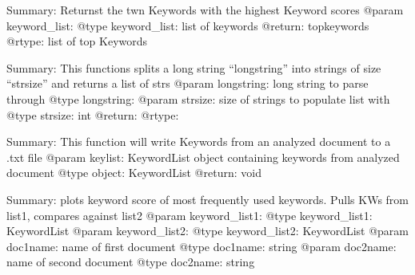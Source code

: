\documentclass[letterpaper,10pt,english]{sphinxmanual}
\begin{document}

\begin{fulllineitems}
\label{\detokenize{functionsv1:common_functions.kwhighestkeyscores}}
Summary: Returnst the twn Keywords with the highest Keyword scores
@param keyword\_list:
@type keyword\_list: list of keywords
@return: topkeywords
@rtype: list of top Keywords

\end{fulllineitems}


\begin{fulllineitems}
\label{\detokenize{functionsv1:common_functions.longstringtostringlist}}
Summary: This functions splits a long string “longstring” into strings of size “strsize” and returns a list of strs
@param longstring:  long string to parse through
@type longstring:
@param strsize: size of strings to populate list with
@type strsize:  int
@return:
@rtype:

\end{fulllineitems}


\begin{fulllineitems}
\label{\detokenize{functionsv1:common_functions.outputkeywordtotext}}
Summary: This function will write Keywords from an analyzed document to a .txt file
@param keylist: KeywordList object containing keywords from analyzed document
@type object: KeywordList
@return: void

\end{fulllineitems}


\begin{fulllineitems}
\label{\detokenize{functionsv1:common_functions.plotkeywordfrequency}}
Summary: plots keyword score of most frequently used keywords. Pulls KWs from list1, compares against list2
@param keyword\_list1:
@type keyword\_list1: KeywordList
@param keyword\_list2:
@type keyword\_list2: KeywordList
@param doc1name: name of first document
@type doc1name: string
@param doc2name: name of second document
@type doc2name: string

\end{fulllineitems}
\end{document}
